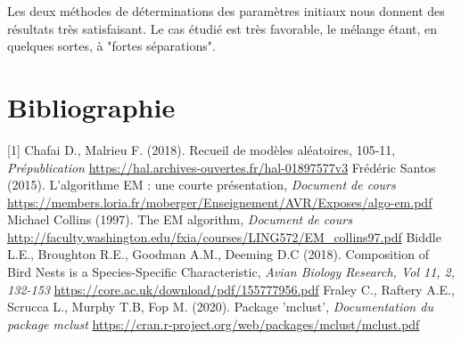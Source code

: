 \documentclass[frenchb]{report}
\newcommand{\1}{\mathbbm{1}}
\theoremstyle{definition}\newtheorem{defn}{Définition}
\theoremstyle{definition}\newtheorem{exm}{Exemple}
\theoremstyle{definition}\newtheorem{nota}{Notation}
\theoremstyle{definition}\newtheorem{rem}{Remarque}
\begin{document}
Les deux méthodes de déterminations des paramètres initiaux nous donnent des résultats très satisfaisant. Le cas étudié est très favorable, le mélange étant, en quelques sortes, à "fortes séparations".








\chapter*{Bibliographie}
 

[1] Chafai D., Malrieu F. (2018). Recueil de modèles aléatoires, 105-11, \textit{Prépublication}\newline
\url{https://hal.archives-ouvertes.fr/hal-01897577v3}\newline
\break
[2] Frédéric Santos (2015). L’algorithme EM : une courte présentation, \textit{Document de cours}
\newline\url{https://members.loria.fr/moberger/Enseignement/AVR/Exposes/algo-em.pdf} \newline
\break
[3] Michael Collins (1997). The EM algorithm, \textit{Document de cours}\newline
\url{http://faculty.washington.edu/fxia/courses/LING572/EM_collins97.pdf} \newline
\break
[4] Biddle L.E., Broughton R.E., Goodman A.M., Deeming D.C (2018). Composition of Bird Nests is a Species-Specific Characteristic, \textit{Avian Biology Research, Vol 11, 2, 132-153}\newline
\url{https://core.ac.uk/download/pdf/155777956.pdf}\newline %
\break
[5] Fraley C., Raftery A.E., Scrucca L., Murphy T.B, Fop M. (2020). Package 'mclust', \textit{Documentation du package mclust}\newline
 \url{https://cran.r-project.org/web/packages/mclust/mclust.pdf} 



\pagebreak
\end{document}
